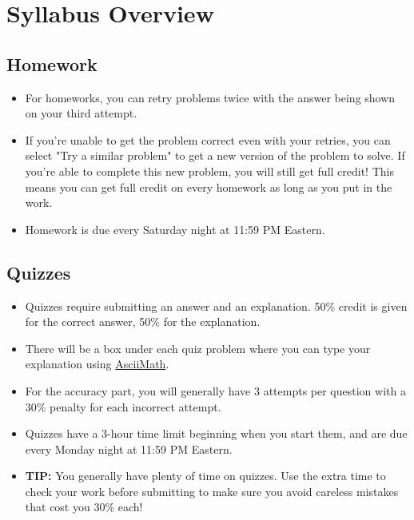 \documentclass[11pt]{exam}
\begin{document}
\pagebreak
\section{Syllabus Overview}
    \vspace{10px}
    \subsection{Homework}
    \begin{itemize}
        \item For homeworks, you can retry problems twice with the answer being shown on your third attempt.
        \item If you're unable to get the problem correct even with your retries, you can select
        "Try a similar problem" to get a new version of the problem to solve. If you're able to complete this new problem,
        you will still get full credit! This means you can get full credit on every homework as long as you put in the work.
        \item Homework is due every Saturday night at 11:59 PM Eastern.
    \end{itemize}

    \vspace{10px}
    \subsection{Quizzes}
    \begin{itemize}
        \item Quizzes require submitting an answer and an explanation. 50\% credit is given for the correct answer, 50\% for the explanation.
        \item There will be a box under each quiz problem where you can type your explanation using \href{https://asciimath.org/}{AsciiMath}.
        \item For the accuracy part, you will generally have 3 attempts per question with a 30\% penalty for each incorrect attempt.
        \item Quizzes have a 3-hour time limit beginning when you start them, and are due every Monday night at 11:59 PM Eastern.
        \item \textbf{TIP:} You generally have plenty of time on quizzes. Use the extra time to check your work before submitting to make sure
        you avoid careless mistakes that cost you 30\% each! 
    \end{itemize}
    
\end{document}
